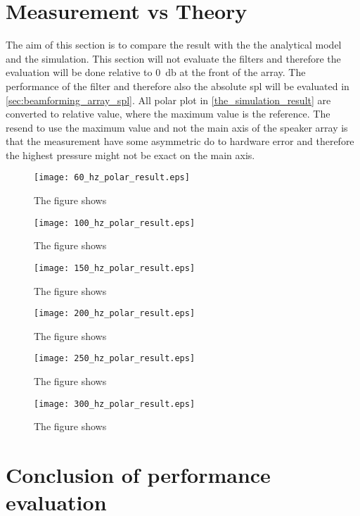 \section{Measurement vs Theory}\label{sec:meas_vs_theory}

The aim of this section is to compare the result with the the analytical model and the simulation. This section will not evaluate the filters and therefore the evaluation will be done relative to \SI{0}{\decibel} at the front of the array. The performance of the filter and therefore also the absolute \gls{spl} will be evaluated in \autoref{sec:beamforming_array_spl}. All polar plot in \autoref{the_simulation_result} are converted to relative value, where the maximum value is the reference. The resend to use the maximum value and not the main axis of the speaker array is that the measurement have some asymmetric do to hardware error and therefore the highest pressure might not be exact on the main axis. 



 \begin{figure}[H]
	\centering
	\texttt{[image: 60\_hz\_polar\_result.eps]}
	\caption{The figure shows}
		\label{fig:60_hz_polar_result}
\end{figure}

 \begin{figure}[H]
	\centering
	\texttt{[image: 100\_hz\_polar\_result.eps]}
	\caption{The figure shows}
		\label{fig:100_hz_polar_result}
\end{figure}

 \begin{figure}[H]
	\centering
	\texttt{[image: 150\_hz\_polar\_result.eps]}
	\caption{The figure shows}
		\label{fig:150_hz_polar_result}
\end{figure}

 \begin{figure}[H]
	\centering
	\texttt{[image: 200\_hz\_polar\_result.eps]}
	\caption{The figure shows}
		\label{fig:200_hz_polar_result}
\end{figure}


 \begin{figure}[H]
	\centering
	\texttt{[image: 250\_hz\_polar\_result.eps]}
	\caption{The figure shows}
		\label{fig:250_hz_polar_result}
\end{figure}

 \begin{figure}[H]
	\centering
	\texttt{[image: 300\_hz\_polar\_result.eps]}
	\caption{The figure shows}
		\label{fig:300_hz_polar_result}
\end{figure}


\section{Conclusion of performance evaluation}




